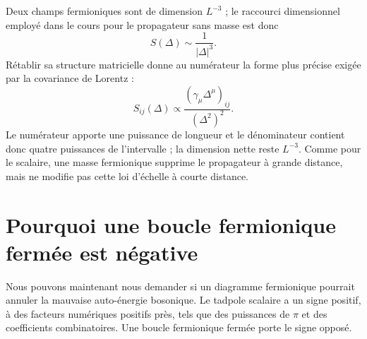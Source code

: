 \begin{classroomqa}
\end{classroomqa}

Deux champs fermioniques sont de dimension \(L^{-3}\) ; le raccourci dimensionnel employé dans le cours pour le propagateur sans masse est donc
\begin{equation}
S(\Delta)\sim\frac{1}{|\Delta|^3}.
\end{equation}
Rétablir sa structure matricielle donne au numérateur la forme plus précise exigée par la covariance de Lorentz :
\begin{equation}
S_{ij}(\Delta)
\propto
\frac{\left(\gamma_\mu\Delta^\mu\right)_{ij}}
{\left(\Delta^2\right)^2}.
\end{equation}
Le numérateur apporte une puissance de longueur et le dénominateur contient donc quatre puissances de l’intervalle ; la dimension nette reste \(L^{-3}\). Comme pour le scalaire, une masse fermionique supprime le propagateur à grande distance, mais ne modifie pas cette loi d’échelle à courte distance.

\section{Pourquoi une boucle fermionique fermée est négative}

Nous pouvons maintenant nous demander si un diagramme fermionique pourrait annuler la mauvaise auto-énergie bosonique. Le tadpole scalaire a un signe positif, à des facteurs numériques positifs près, tels que des puissances de \(\pi\) et des coefficients combinatoires. Une boucle fermionique fermée porte le signe opposé.

\begin{classroomqa}
\end{classroomqa}


